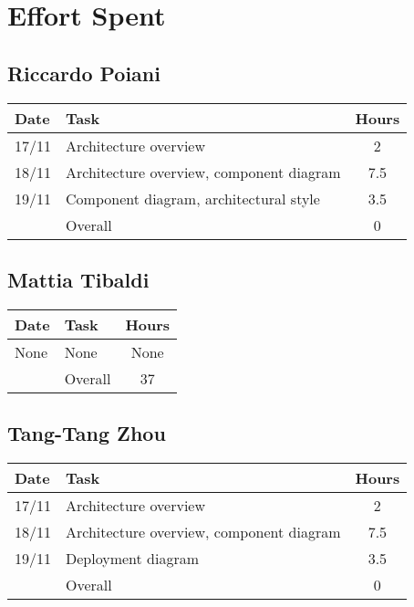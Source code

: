 \section{Effort Spent}

\subsection{Riccardo Poiani}

\begin{table}[H]
\begin{tabularx}{\textwidth}{|l|X|c|}
\hline
\rowcolor[HTML]{C0C0C0} 
Date & Task & Hours\\ \hline
17/11 & Architecture overview & 2\\ \hline
18/11 & Architecture overview, component diagram & 7.5 \\ \hline
19/11 & Component diagram, architectural style & 3.5\\ \hline
\rowcolor[HTML]{C0C0C0} 
& Overall & 0 \\ \hline
\end{tabularx}
\end{table}

\subsection{Mattia Tibaldi}

\begin{table}[H]
\begin{tabularx}{\textwidth}{|l|X|c|}
\hline
\rowcolor[HTML]{C0C0C0} 
Date & Task & Hours\\ \hline
None & None & None \\ \hline
\rowcolor[HTML]{C0C0C0} 
& Overall & 37\\ \hline
\end{tabularx}
\end{table}

\subsection{Tang-Tang Zhou}

\begin{table}[H]
\begin{tabularx}{\textwidth}{|l|X|c|}
\hline
\rowcolor[HTML]{C0C0C0} 
Date & Task & Hours\\ \hline
17/11 & Architecture overview & 2\\ \hline
18/11 & Architecture overview, component diagram & 7.5 \\ \hline
19/11 & Deployment diagram & 3.5\\ \hline
\rowcolor[HTML]{C0C0C0} 
& Overall & 0 \\ \hline
\end{tabularx}
\end{table}